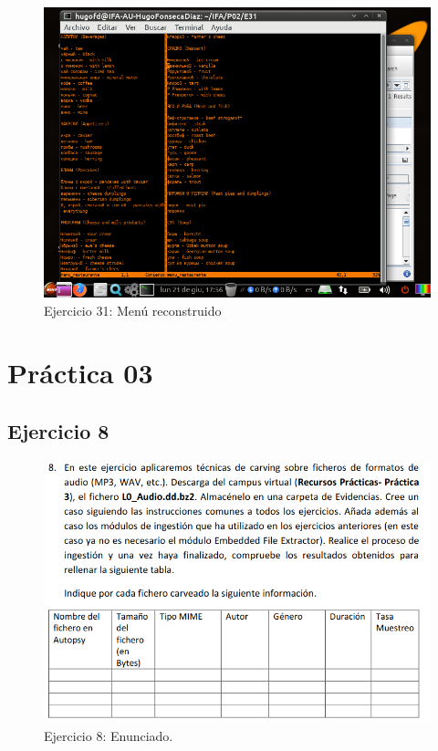 \documentclass[11pt]{article}
\begin{document}
\begin{figure}[H]
    \caption{Ejercicio 31: Menú reconstruido}
  \centering
  \includegraphics[scale=0.7]{p02/e31-7.png}
\end{figure}



\section{Práctica 03}

\subsection{Ejercicio 8}

\begin{figure}[H]
    \caption{Ejercicio 8: Enunciado.}
  \centering
  \includegraphics[scale=0.7]{other/enunciado_p03_e8.png}
\end{figure}
\end{document}
